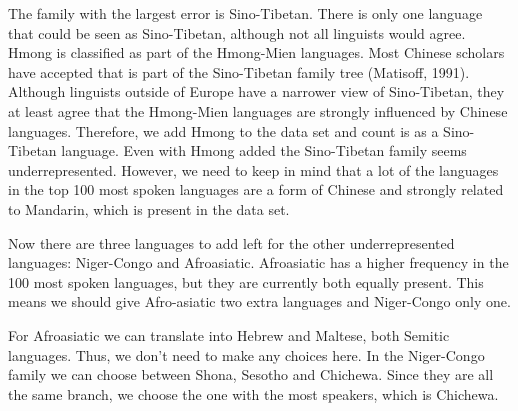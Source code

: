 The family with the largest error is Sino-Tibetan. There is only one language that could be seen as Sino-Tibetan, although not all linguists would agree. Hmong is classified as part of the Hmong-Mien languages. Most Chinese scholars have accepted that is part of the Sino-Tibetan family tree (Matisoff, 1991). Although linguists outside of Europe have a narrower view of Sino-Tibetan, they at least agree that the Hmong-Mien languages are strongly influenced by Chinese languages. Therefore, we add Hmong to the data set and count is as a Sino-Tibetan language. Even with Hmong added the Sino-Tibetan family seems underrepresented. However, we need to keep in mind that a lot of the languages in the top 100 most spoken languages are a form of Chinese and strongly related to Mandarin, which is present in the data set. 

Now there are three languages to add left for the other underrepresented languages: Niger-Congo and Afroasiatic. Afroasiatic has a higher frequency in the 100 most spoken languages, but they are currently both equally present. This means we should give Afro-asiatic two extra languages and Niger-Congo only one.  

For Afroasiatic we can translate into Hebrew and Maltese, both Semitic languages. Thus, we don’t need to make any choices here. In the Niger-Congo family we can choose between Shona, Sesotho and Chichewa. Since they are all the same branch, we choose the one with the most speakers, which is Chichewa.   

